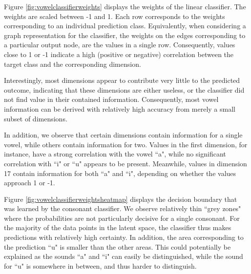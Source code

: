 		Figure \ref{fig:vowelclassifierweights} displays the weights of the linear classifier. The weights are scaled between -1 and 1. Each row corresponds to the weights corresponding to an individual prediction class. Equivalently, when considering a graph representation for the classifier, the weights on the edges corresponding to a particular output node, are the values in a single row. Consequently, values close to 1 or -1 indicate a high (positive or negative) correlation between the target class and the corresponding dimension. 
		
		Interestingly, most dimensions appear to contribute very little to the predicted outcome, indicating that these dimensions are either useless, or the classifier did not find value in their contained information. Consequently, most vowel information can be derived with relatively high accuracy from merely a small subset of dimensions. 
		
		In addition, we observe that certain dimensions contain information for a single vowel, while others contain information for two. Values in the first dimension, for instance, have a strong correlation with the vowel ``a", while no significant correlation with ``i" or ``u" appears to be present. Meanwhile, values in dimension 17 contain information for both ``a" and ``i", depending on whether the values approach 1 or -1.
		
		Figure \ref{fig:vowelclassifierweightsheatmap} displays the decision boundary that was learned by the consonant classifier. We observe relatively thin ``grey zones" where the probabilities are not particularly decisive for a single consonant. For the majority of the data points in the latent space, the classifier thus makes predictions with relatively high certainty. In addition, the area corresponding to the prediction ``u" is smaller than the other areas. This could potentially be explained as the sounds ``a" and ``i" can easily be distinguished, while the sound for ``u" is somewhere in between, and thus harder to distinguish.
		
		
		
		
		
